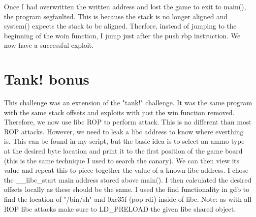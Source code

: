 \documentclass{article}
\begin{document}
Once I had overwritten the written address and lost the game to exit to main(), the program segfaulted. This is because the stack is no longer aligned and system() expects the 
stack to be aligned. Therfore, instead of jumping to the beginning of the woin function, I jump just after the push rbp instruction. We now have a successful exploit.

\section{Tank! bonus}
This challenge was an extension of the "tank!" challenge. It was the same program with the same stack offsets and exploits with just the win function removed. 
Therefore, we now use libc ROP to perform attack. This is no different than most ROP attacks. However, we need to leak a libc address to know where everthing is. 
This can be found in my script, but the basic idea is to select an ammo type at the desired byte location and print it to the first position of the game board (this is the same technique I used to search the canary). We can then 
view its value and repeat this to piece together the value of a known libc address. I chose the \_\_libc\_start main address stored above main(). I then calculated the desired offsets 
locally as these should be the same. I used the find functionality in gdb to find the location of "/bin/sh" and 0xc35f (pop rdi) inside of libc. Note: as with all ROP libc attacks 
make sure to LD_PRELOAD the given libc shared object.
\end{document}
